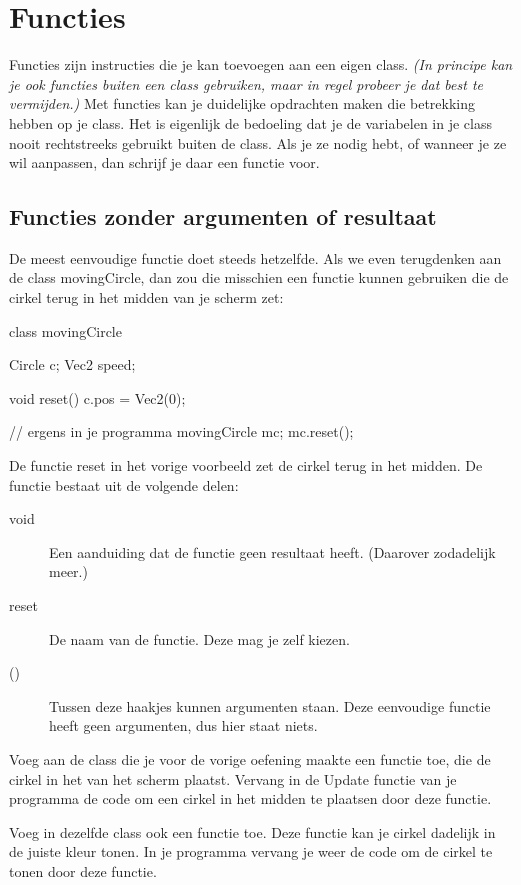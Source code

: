\chapter{Functies}

Functies zijn instructies die je kan toevoegen aan een eigen class. \textit{(In principe kan je ook functies buiten een class gebruiken, maar in regel probeer je dat best te vermijden.)} Met functies kan je duidelijke opdrachten maken die betrekking hebben op je class. Het is eigenlijk de bedoeling dat je de variabelen in je class nooit rechtstreeks gebruikt buiten de class. Als je ze nodig hebt, of wanneer je ze wil aanpassen, dan schrijf je daar een functie voor.

\section{Functies zonder argumenten of resultaat}

De meest eenvoudige functie doet steeds hetzelfde. Als we even terugdenken aan de class movingCircle, dan zou die misschien een functie kunnen gebruiken die de cirkel terug in het midden van je scherm zet:

\begin{code}
class movingCircle {
  Circle c;
  Vec2 speed;
  
  void reset() {
    c.pos = Vec2(0);
  }
}

// ergens in je programma
movingCircle mc;
mc.reset();

\end{code}

De functie reset in het vorige voorbeeld zet de cirkel terug in het midden. De functie bestaat uit de volgende delen:

\begin{description}
\item[void]Een aanduiding dat de functie geen resultaat heeft. (Daarover zodadelijk meer.)
\item[reset]De naam van de functie. Deze mag je zelf kiezen.
\item[()]Tussen deze haakjes kunnen argumenten staan. Deze eenvoudige functie heeft geen argumenten, dus hier staat niets.
\end{description}

\begin{exercise}
Voeg aan de class die je voor de vorige oefening maakte een functie  toe, die de cirkel in het van het scherm plaatst. Vervang in de Update functie van je programma de code om een cirkel in het midden te plaatsen door deze functie.

Voeg in dezelfde class ook een functie  toe. Deze functie kan je cirkel dadelijk in de juiste kleur tonen. In je programma vervang je weer de code om de cirkel te tonen door deze functie.
\end{exercise}

